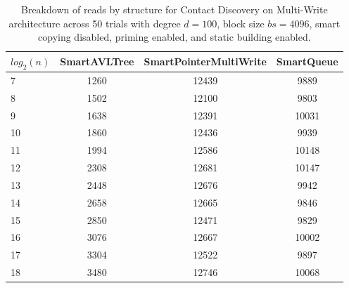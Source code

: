 \begin{table}[]
\centering
\begin{tabular}{|l|c|c|c|}
$log_2(n)$ & SmartAVLTree & SmartPointerMultiWrite & SmartQueue \\ \hline
7 & 1260 & 12439 & 9889 \\ \hline
8 & 1502 & 12100 & 9803 \\ \hline
9 & 1638 & 12391 & 10031 \\ \hline
10 & 1860 & 12436 & 9939 \\ \hline
11 & 1994 & 12586 & 10148 \\ \hline
12 & 2308 & 12681 & 10147 \\ \hline
13 & 2448 & 12676 & 9942 \\ \hline
14 & 2658 & 12665 & 9846 \\ \hline
15 & 2850 & 12471 & 9829 \\ \hline
16 & 3076 & 12667 & 10002 \\ \hline
17 & 3304 & 12522 & 9897 \\ \hline
18 & 3480 & 12746 & 10068 \\ \hline
\end{tabular}
\caption{Breakdown of reads by structure for Contact Discovery on Multi-Write architecture across 50 trials with degree $d=100$, block size $bs=4096$, smart copying disabled, priming enabled, and static building enabled.}
    \label{tab:reads_by_structure_cd_d100_bs4096_trials50_copiesfalse_primetrue_staticinsertiontrue_ptmultiwrite_movetrue}
\end{table}

